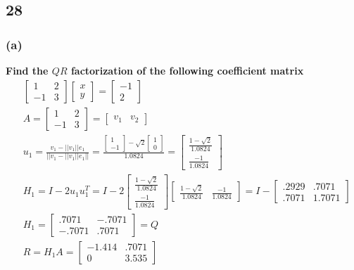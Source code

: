 \documentclass[10pt,letterpaper]{article}
\begin{document}
	\subsection*{28}
	\subsubsection*{(a)} \textbf{Find the $QR$ factorization of the following coefficient matrix}
	\begin{align*}
	& \begin{bmatrix}
	1 & 2 \\ -1 & 3
	\end{bmatrix} \begin{bmatrix}
	x \\ y
	\end{bmatrix} = \begin{bmatrix}
	-1 \\ 2
	\end{bmatrix} \\ 
	& A = \begin{bmatrix}
	1 & 2 \\ -1 & 3
	\end{bmatrix} = \begin{bmatrix}
	v_1 & v_2
	\end{bmatrix} \\ 
	&  u_1 = \frac{v_1 - ||v_1||e_1}{||v_1 - ||v_1||e_1||} = \frac{\begin{bmatrix}
		1 \\ -1
		\end{bmatrix} - \sqrt{2} \begin{bmatrix}
		1 \\ 0
		\end{bmatrix}}{1.0824} = \begin{bmatrix}
	\frac{1 - \sqrt{2}}{1.0824} \\ \frac{-1}{1.0824}
	\end{bmatrix} \\ 
	& H_1 = I -2u_1u_1^T = I - 2 \begin{bmatrix}
	\frac{1 - \sqrt{2}}{1.0824} \\ \frac{-1}{1.0824}
	\end{bmatrix} \begin{bmatrix}
	\frac{1 - \sqrt{2}}{1.0824} & \frac{-1}{1.0824}
	\end{bmatrix} = I - \begin{bmatrix}
	.2929 & .7071 \\ .7071 & 1.7071 
	\end{bmatrix} \\ 
	& H_1 = \boxed{\begin{bmatrix}
	.7071 & -.7071 \\ -.7071 & .7071 
	\end{bmatrix} = Q} \\ 
	& \boxed{R = H_1A = \begin{bmatrix}
		-1.414 & .7071  \\ 0 & 3.535
		\end{bmatrix} }
	\end{align*}
\end{document}
